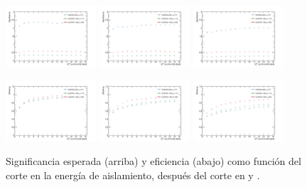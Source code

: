 \begin{figure}[!h]
  \centering

  \includegraphics[width=0.3\textwidth]{figures/iso_20_sig}
  \includegraphics[width=0.3\textwidth]{figures/iso_30_sig}
  \includegraphics[width=0.3\textwidth]{figures/iso_40_sig}

  \includegraphics[width=0.3\textwidth]{figures/iso_20_eff}
  \includegraphics[width=0.3\textwidth]{figures/iso_30_eff}
  \includegraphics[width=0.3\textwidth]{figures/iso_40_eff}

  \caption{Significancia esperada (arriba) y eficiencia (abajo) como función del
    corte en la energía de aislamiento, después del corte en {\pt} y {\met}.}
  \label{fig:photon_iso_sig}
\end{figure}



